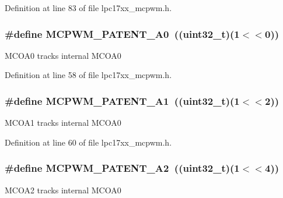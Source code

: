 \-Definition at line 83 of file lpc17xx\-\_\-mcpwm.\-h.

\hypertarget{group___m_c_p_w_m___public___macros_gac2a014461c52783ba46de0ae19d03700}{
\subsubsection[{\-M\-C\-P\-W\-M\-\_\-\-P\-A\-T\-E\-N\-T\-\_\-\-A0}]{\setlength{\rightskip}{0pt plus 5cm}\#define {\bf \-M\-C\-P\-W\-M\-\_\-\-P\-A\-T\-E\-N\-T\-\_\-\-A0}~((uint32\-\_\-t)(1$<$$<$0))}}\label{group___m_c_p_w_m___public___macros_gac2a014461c52783ba46de0ae19d03700}
\-M\-C\-O\-A0 tracks internal \-M\-C\-O\-A0 

\-Definition at line 58 of file lpc17xx\-\_\-mcpwm.\-h.

\hypertarget{group___m_c_p_w_m___public___macros_gac1a0fe63f0a4913bc3fca470b9189e03}{
\subsubsection[{\-M\-C\-P\-W\-M\-\_\-\-P\-A\-T\-E\-N\-T\-\_\-\-A1}]{\setlength{\rightskip}{0pt plus 5cm}\#define {\bf \-M\-C\-P\-W\-M\-\_\-\-P\-A\-T\-E\-N\-T\-\_\-\-A1}~((uint32\-\_\-t)(1$<$$<$2))}}\label{group___m_c_p_w_m___public___macros_gac1a0fe63f0a4913bc3fca470b9189e03}
\-M\-C\-O\-A1 tracks internal \-M\-C\-O\-A0 

\-Definition at line 60 of file lpc17xx\-\_\-mcpwm.\-h.

\hypertarget{group___m_c_p_w_m___public___macros_gaea7eea388b6f13ee499d9a4907b7f428}{
\subsubsection[{\-M\-C\-P\-W\-M\-\_\-\-P\-A\-T\-E\-N\-T\-\_\-\-A2}]{\setlength{\rightskip}{0pt plus 5cm}\#define {\bf \-M\-C\-P\-W\-M\-\_\-\-P\-A\-T\-E\-N\-T\-\_\-\-A2}~((uint32\-\_\-t)(1$<$$<$4))}}\label{group___m_c_p_w_m___public___macros_gaea7eea388b6f13ee499d9a4907b7f428}
\-M\-C\-O\-A2 tracks internal \-M\-C\-O\-A0 

